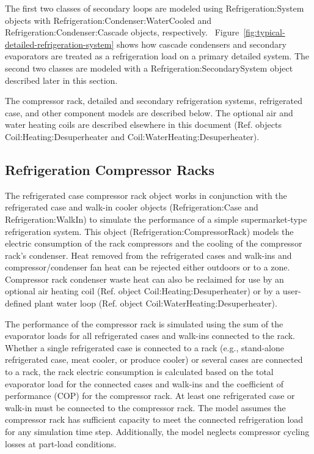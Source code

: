 The first two classes of secondary loops are modeled using Refrigeration:System objects with Refrigeration:Condenser:WaterCooled and Refrigeration:Condenser:Cascade objects, respectively.~ Figure~\ref{fig:typical-detailed-refrigeration-system} shows how cascade condensers and secondary evaporators are treated as a refrigeration load on a primary detailed system. The second two classes are modeled with a Refrigeration:SecondarySystem object described later in this section.

The compressor rack, detailed and secondary refrigeration systems, refrigerated case, and other component models are described below. The optional air and water heating coils are described elsewhere in this document (Ref. objects Coil:Heating:Desuperheater and Coil:WaterHeating:Desuperheater).

\subsection{Refrigeration Compressor Racks}\label{refrigeration-compressor-racks}

The refrigerated case compressor rack object works in conjunction with the refrigerated case and walk-in cooler objects (Refrigeration:Case and Refrigeration:WalkIn) to simulate the performance of a simple supermarket-type refrigeration system. This object (Refrigeration:CompressorRack) models the electric consumption of the rack compressors and the cooling of the compressor rack's condenser. Heat removed from the refrigerated cases and walk-ins and compressor/condenser fan heat can be rejected either outdoors or to a zone. Compressor rack condenser waste heat can also be reclaimed for use by an optional air heating coil (Ref. object Coil:Heating:Desuperheater) or by a user-defined plant water loop (Ref. object Coil:WaterHeating:Desuperheater).

The performance of the compressor rack is simulated using the sum of the evaporator loads for all refrigerated cases and walk-ins connected to the rack. Whether a single refrigerated case is connected to a rack (e.g., stand-alone refrigerated case, meat cooler, or produce cooler) or several cases are connected to a rack, the rack electric consumption is calculated based on the total evaporator load for the connected cases and walk-ins and the coefficient of performance (COP) for the compressor rack. At least one refrigerated case or walk-in must be connected to the compressor rack. The model assumes the compressor rack has sufficient capacity to meet the connected refrigeration load for any simulation time step. Additionally, the model neglects compressor cycling losses at part-load conditions.

